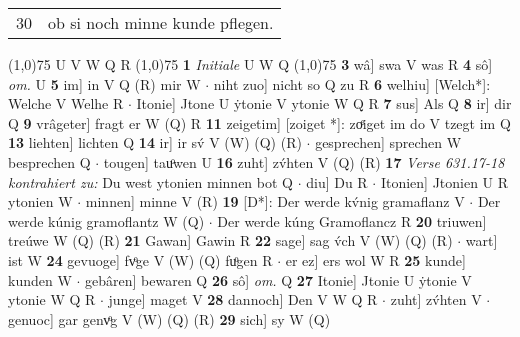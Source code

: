 \documentclass[8pt,a4paper,notitlepage]{article}
\begin{document}
\begin{table}[ht]
\begin{minipage}[t]{0.5\linewidth}
\begin{tabular}{rl}
30 & ob si noch minne kunde pflegen.\\ 
\end{tabular}
\scriptsize
\line(1,0){75} \newline
U V W Q R \newline
\line(1,0){75} \newline
\textbf{1} \textit{Initiale} U W Q  \newline
\line(1,0){75} \newline
\textbf{3} wâ] swa V was R \textbf{4} sô] \textit{om.} U \textbf{5} im] in V Q (R) mir W  $\cdot$ niht zuo] nicht so Q zu R \textbf{6} welhiu] [Welch*]: Welche V Welhe R  $\cdot$ Itonie] Jtone U ẏtonie V ytonie W Q R \textbf{7} sus] Als Q \textbf{8} ir] dir Q \textbf{9} vrâgeter] fragt er W (Q) R \textbf{11} zeigetim] [zoiget *]: zoͤiget im do V tzegt im Q \textbf{13} liehten] lichten Q \textbf{14} ir] ir sv́ V (W) (Q) (R)  $\cdot$ gesprechen] sprechen W besprechen Q  $\cdot$ tougen] tauͦwen U \textbf{16} zuht] zv́hten V (Q) (R) \textbf{17} \textit{Verse 631.17-18 kontrahiert zu:} Du west ytonien minnen bot Q   $\cdot$ diu] Du R  $\cdot$ Itonien] Jtonien U R ytonien W  $\cdot$ minnen] minne V (R) \textbf{19} [D*]: Der werde kv́nig gramaflanz V  $\cdot$ Der werde kúnig gramoflantz W (Q)  $\cdot$ Der werde kúng Gramoflancz R \textbf{20} triuwen] treúwe W (Q) (R) \textbf{21} Gawan] Gawin R \textbf{22} sage] sag v́ch V (W) (Q) (R)  $\cdot$ wart] ist W \textbf{24} gevuoge] fvͦge V (W) (Q) fuͦgen R  $\cdot$ er ez] ers wol W R \textbf{25} kunde] kunden W  $\cdot$ gebâren] bewaren Q \textbf{26} sô] \textit{om.} Q \textbf{27} Itonie] Jtonie U ẏtonie V ytonie W Q R  $\cdot$ junge] maget V \textbf{28} dannoch] Den V W Q R  $\cdot$ zuht] zv́hten V  $\cdot$ genuoc] gar genvͦg V (W) (Q) (R) \textbf{29} sich] sy W (Q) \newline
\end{minipage}
\end{table}
\end{document}
